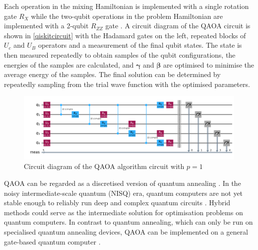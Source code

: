 Each operation in the mixing Hamiltonian is implemented with a single rotation gate $R_X$ while the two-qubit operations in the problem Hamiltonian are implemented with a 2-qubit $R_{ZZ}$ gate \cite{qaoareview}. A circuit diagram of the QAOA circuit is shown in \autoref{qiskitcircuit} with the Hadamard gates on the left, repeated blocks of $U_c$ and $U_B$ operators and a measurement of the final qubit states. The state is then measured repeatedly to obtain samples of the qubit configurations, the energies of the samples are calculated, and $\boldsymbol{\gamma}$ and $\boldsymbol{\beta}$ are optimised to minimise the average energy of the samples. The final solution can be determined by repeatedly sampling from the trial wave function with the optimised parameters.

\begin{figure}[htb!]
    \centering
    \includegraphics[width=\linewidth]{images/qaoanewcircuit.png}
    \caption{Circuit diagram of the QAOA algorithm circuit with $p=1$}
    \label{qiskitcircuit}
\end{figure}


QAOA can be regarded as a discretised version of quantum annealing \cite{qaoareview}. In the noisy intermediate-scale quantum (NISQ) era, quantum computers are not yet stable enough to reliably run deep and complex quantum circuits \cite{qaoareview}. Hybrid methods could serve as the intermediate solution for optimisation problems on quantum computers. In contrast to quantum annealing, which can only be run on specialised quantum annealing devices, QAOA can be implemented on a general gate-based quantum computer . 